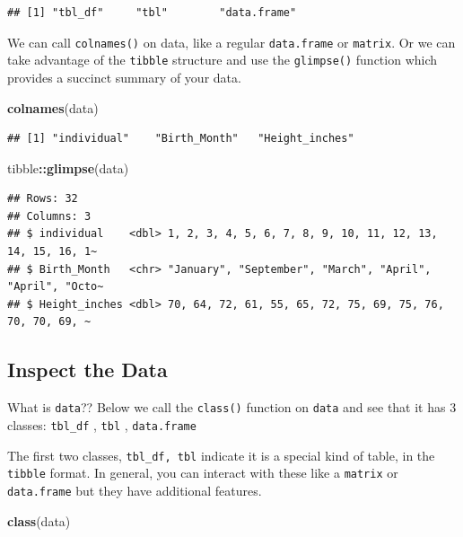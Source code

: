 \documentclass[
]{book}
\newenvironment{Shaded}{\begin{snugshade}}{\end{snugshade}}
\newcommand{\FunctionTok}[1]{\textcolor[rgb]{0.13,0.29,0.53}{\textbf{#1}}}
\newcommand{\NormalTok}[1]{#1}
\newcommand{\SpecialCharTok}[1]{\textcolor[rgb]{0.81,0.36,0.00}{\textbf{#1}}}
\begin{document}
\begin{verbatim}
## [1] "tbl_df"     "tbl"        "data.frame"
\end{verbatim}

We can call \texttt{colnames()} on data, like a regular \texttt{data.frame} or \texttt{matrix}. Or we can take advantage of the \texttt{tibble} structure and use the \texttt{glimpse()} function which provides a succinct summary of your data.

\begin{Shaded}
\begin{Highlighting}[]
\FunctionTok{colnames}\NormalTok{(data)}
\end{Highlighting}
\end{Shaded}

\begin{verbatim}
## [1] "individual"    "Birth_Month"   "Height_inches"
\end{verbatim}

\begin{Shaded}
\begin{Highlighting}[]
\NormalTok{tibble}\SpecialCharTok{::}\FunctionTok{glimpse}\NormalTok{(data)}
\end{Highlighting}
\end{Shaded}

\begin{verbatim}
## Rows: 32
## Columns: 3
## $ individual    <dbl> 1, 2, 3, 4, 5, 6, 7, 8, 9, 10, 11, 12, 13, 14, 15, 16, 1~
## $ Birth_Month   <chr> "January", "September", "March", "April", "April", "Octo~
## $ Height_inches <dbl> 70, 64, 72, 61, 55, 65, 72, 75, 69, 75, 76, 70, 70, 69, ~
\end{verbatim}

\hypertarget{inspect-the-data-1}{%
\subsection{Inspect the Data}\label{inspect-the-data-1}}

What is \texttt{data}?? Below we call the \texttt{class()} function on \texttt{data} and see that it has 3 classes:
\texttt{tbl\_df} , \texttt{tbl} , \texttt{data.frame}

The first two classes, \texttt{tbl\_df,\ tbl} indicate it is a special kind of table, in the \texttt{tibble} format. In general, you can interact with these like a \texttt{matrix} or \texttt{data.frame} but they have additional features.

\begin{Shaded}
\begin{Highlighting}[]
\FunctionTok{class}\NormalTok{(data)}
\end{Highlighting}
\end{Shaded}
\end{document}

